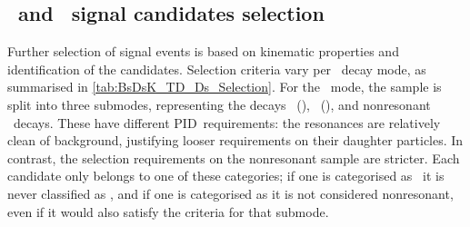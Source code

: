 \subsection{\BsDsK~and \BsDsPi~signal candidates selection} \label{sec:BsDsK_TD_Selection_Signal}
Further selection of signal events is based on kinematic properties and identification of the candidates.
Selection criteria vary per \Dsm~decay mode, as summarised in \cref{tab:BsDsK_TD_Ds_Selection}.
For the \DsmKKPi~mode, the sample is split into three submodes, representing the decays \DsmPhiPi~(\PhiKK), \DsmKstK~(\KstKPi), and nonresonant \DsmKKPi~decays.
These have different PID~requirements: the resonances are relatively clean of background, justifying looser requirements on their daughter particles.
In contrast, the selection requirements on the nonresonant sample are stricter.
Each candidate only belongs to one of these categories; \ie if one is categorised as \DsmPhiPi~it is never classified as \DsmKstK, and if one is categorised as \DsmKstK it is not considered nonresonant, even if it would also satisfy the criteria for that submode.

